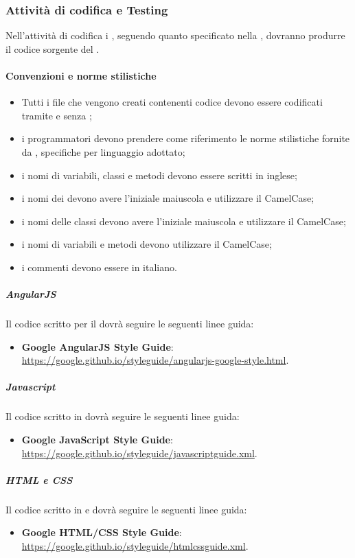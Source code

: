 \documentclass[12pt,a4paper]{article}
\begin{document}
\subsubsection{Attività di codifica e Testing}
\label{code}

Nell'attività di codifica i \PRpl{}, seguendo quanto specificato nella \DP{}, dovranno produrre il codice sorgente del .

\paragraph{Convenzioni e norme stilistiche}
\begin{itemize}
	\item Tutti i file che vengono creati contenenti codice devono essere codificati tramite  e senza ;
	\item i programmatori devono prendere come riferimento le norme stilistiche fornite da , specifiche per
	linguaggio adottato;
	\item i nomi di variabili, classi e metodi devono essere scritti in inglese;
	\item i nomi dei  devono avere l’iniziale maiuscola e utilizzare il CamelCase;
	\item i nomi delle classi devono avere l’iniziale maiuscola e utilizzare il CamelCase;
	\item i nomi di variabili e metodi devono utilizzare il CamelCase;
	\item i commenti devono essere in italiano.
\end{itemize}


\subparagraph{AngularJS}
Il codice scritto per il   dovrà seguire le seguenti linee guida:
\begin{itemize}
	\item \textbf{Google AngularJS Style Guide}: \url{https://google.github.io/styleguide/angularjs-google-style.html}.
\end{itemize}

\subparagraph{Javascript}
Il codice scritto in  dovrà seguire le seguenti linee guida:
\begin{itemize}
	\item \textbf{Google JavaScript Style Guide}: \url{https://google.github.io/styleguide/javascriptguide.xml}.
\end{itemize}

\subparagraph{HTML e CSS}
Il codice scritto in  e  dovrà seguire le seguenti linee guida:
\begin{itemize}
	\item \textbf{Google HTML/CSS Style Guide}: \url{https://google.github.io/styleguide/htmlcssguide.xml}.
\end{itemize}
\end{document}
